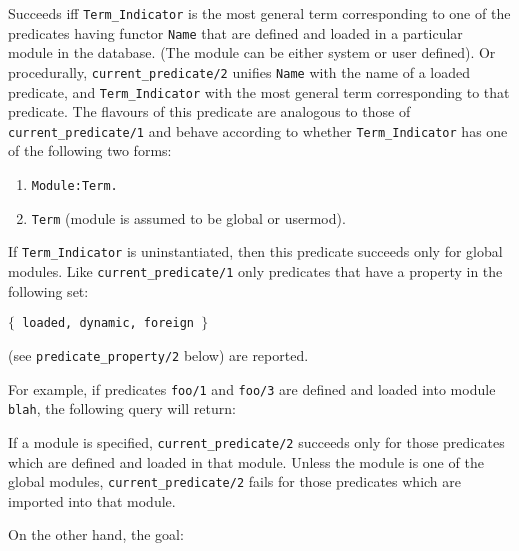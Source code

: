 \begin{description}
    Succeeds iff {\tt Term\_Indicator} is the most general term 
    corresponding to one of the predicates having functor {\tt Name} that are 
    defined and loaded in a particular module in the database. 
    (The module can be either system or user defined).
    Or procedurally, {\tt current\_predicate/2}
    unifies {\tt Name} with the name of a loaded predicate, and 
    {\tt Term\_Indicator} with the most general term corresponding to that
    predicate.  The flavours of this predicate are analogous to those of 
    {\tt current\_predicate/1} and behave according to whether 
    {\tt Term\_Indicator} has one of the following two forms:
    \begin{enumerate}
    \item{\tt Module:Term.}
    \item{\tt Term} (module is assumed to be global or usermod).
    \end{enumerate}
    If {\tt Term\_Indicator} is uninstantiated, then this predicate succeeds
    only for global modules. Like {\tt current\_predicate/1} only 
    predicates that have a property in the following set:
    \begin{center}
    {\tt $\{$ loaded, dynamic, foreign $\}$ }
    \end{center}
    (see {\tt predicate\_property/2} below) are reported.

    For example, if predicates {\tt foo/1} and {\tt foo/3} are defined and
    loaded into module {\tt blah}, the following query will return:


    If a module is specified, {\tt current\_predicate/2} succeeds only for
    those predicates which are defined and loaded in that module. Unless 
    the module is one of the global modules, {\tt current\_predicate/2} fails
    for those predicates which are imported into that module.

    On the other hand, the goal:


\end{description}
